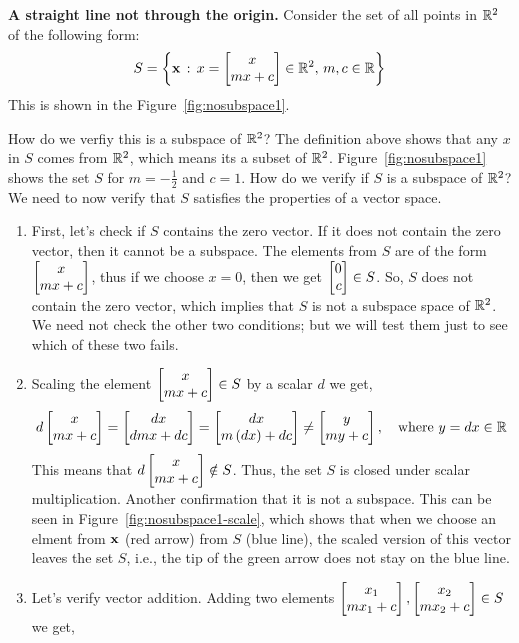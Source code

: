 \begin{example}
    \textbf{A straight line not through the origin.} Consider the set of all points in $\mathbb{R}^2$ of the following form:
    \[ S = \lc \mf{x} \, : \, x = \bmxc x \\ m x + c \emx \in \mb{R}^2, \, m, c \in \mb{R} \rc \]
    This is shown in the Figure~\ref{fig:nosubspace1}.

    How do we verfiy this is a subspace of $\mathbb{R}^2$? The definition above shows that any $x$ in $S$ comes from $\mathbb{R}^2$, which means its a subset of $\mathbb{R}^2$. Figure~\ref{fig:nosubspace1} shows the set $S$ for $m = -\frac{1}{2}$ and $c = 1$.
    \noindent How do we verify if $S$ is a subspace of $\mathbb{R}^2$? We need to now verify that $S$ satisfies the properties of a vector space.
    \begin{enumerate}
        \item First, let's check if $S$ contains the zero vector. If it does not contain the zero vector, then it cannot be a subspace. The elements from $S$ are of the form $\bmxc x \\ m x + c\emx$, thus if we choose $x = 0$, then we get $\bmx 0 \\ c \emx \in S$. So, $S$ does not contain the zero vector, which implies that $S$ is not a subspace space of $\mathbb{R}^2$. We need not check the other two conditions; but we will test them just to see which of these two fails.
        \item Scaling the element $\bmxc x \\ m x + c \emx \in S$ by a scalar $d$ we get,
        \[ d \bmxc x \\ m x + c\emx = \bmxc d x \\ d m x + d c \emx = \bmxc d x \\ m \pp{d x} + dc \emx \neq \bmxc y \\ m y + c\emx, \quad \text{where} \,\, y = d x \in \mb{R} \]
        This means that $d \bmxc x \\ m x + c\emx \notin S$. Thus, the set $S$ is closed under scalar multiplication. Another confirmation that it is not a subspace. This can be seen in Figure~\ref{fig:nosubspace1-scale}, which shows that when we choose an elment from $\mathbf{x}$ (red arrow) from $S$ (blue line), the scaled version of this vector leaves the set $S$, i.e., the tip of the green arrow does not stay on the blue line.
        \item Let's verify vector addition. Adding two elements $\bmxc x_1 \\ m x_1 + c\emx, \bmxc x_2 \\ m x_2 + c\emx \in S$ we get,

\end{enumerate}
\end{example}
